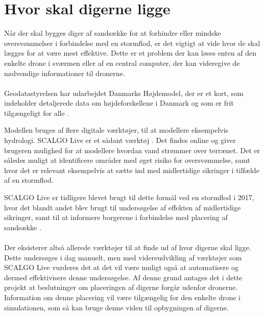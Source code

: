 \section{Hvor skal digerne ligge}\label{sc:digebeliggenhed}
Når der skal bygges diger af sandsække for at forhindre eller mindske oversvømmelser i forbindelse med en stormflod, er det vigtigt at vide hvor de skal lægges for at være mest effektive. Dette er et problem der kan løses enten af den enkelte drone i sværmen eller af en central computer, der kan videregive de nødvendige informationer til dronerne.  \\\\
Geodatastyrelsen har udarbejdet Danmarks Højdemodel, der er et kort, som indeholder detaljerede data om højdeforskellene i Danmark og som er frit tilgængeligt for alle \cite{dkhoejdemodel}. \par Modellen bruges af flere digitale værktøjer, til at modellere eksempelvis hydrologi. SCALGO Live er et sådant værktøj \cite{scalgo}\cite{omscalgo}. Det findes online og giver brugeren mulighed for at modellere hvordan vand strømmer over terrænet. Det er således muligt at identificere områder med øget risiko for oversvømmelse, samt hvor det er relevant eksempelvis at sætte ind med midlertidige sikringer i tilfælde af en stormflod\cite{scalgo}\cite{omscalgo}. \par
SCALGO Live er tidligere blevet brugt til dette formål ved en stormflod i 2017, hvor det blandt andet blev brugt til undersøgelse af effekten af midlertidige sikringer, samt til at informere borgerene i forbindelse med placering af sandsække \cite{alarmscalgo}.\\\\
Der eksisterer altså allerede værktøjer til at finde ud af hvor digerne skal ligge. Dette undersøges i dag manuelt, men med videreudvikling af værktøjer som SCALGO Live vurderes det at det vil være muligt også at automatisere og dermed effektivisere denne undersøgelse. Af denne grund antages det i dette projekt at beslutninger om placeringen af digerne forgår udenfor dronerne. Information om denne placering vil være tilgængelig for den enkelte drone i simulationen, som så kan bruge denne viden til opbygningen af digerne.  

